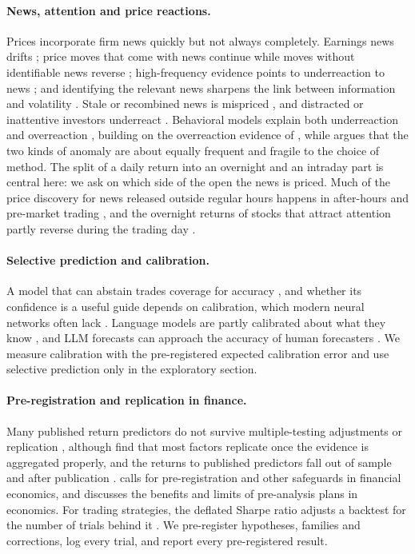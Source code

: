 \paragraph{News, attention and price reactions.} Prices incorporate firm news quickly
\citep{patell1984,busse2002} but not always completely. Earnings news drifts \citep{bernard1989}; price moves
that come with news continue while moves without identifiable news reverse \citep{chan2003,savor2012};
high-frequency evidence points to underreaction to news \citep{jiang2021}; and identifying the relevant news
sharpens the link between information and volatility \citep{boudoukh2019}. Stale or recombined news is
mispriced \citep{tetlock2011,fedyk2023}, and distracted or inattentive investors underreact
\citep{hirshleifer2009,dellavigna2009}. Behavioral models explain both underreaction and overreaction
\citep{barberis1998,daniel1998}, building on the overreaction evidence of \citet{debondt1985}, while
\citet{fama1998} argues that the two kinds of anomaly are about equally frequent and fragile to the choice of
method. The split of a daily return into an overnight and an intraday part \citep{lou2019} is central here: we
ask on which side of the open the news is priced. Much of the price discovery for news released outside regular
hours happens in after-hours and pre-market trading \citep{barclay2003}, and the overnight returns of stocks that
attract attention partly reverse during the trading day \citep{berkman2012}.

\paragraph{Selective prediction and calibration.} A model that can abstain trades coverage for accuracy
\citep{geifman2017}, and whether its confidence is a useful guide depends on calibration, which modern neural
networks often lack \citep{pakdamannaeini2015,guo2017}. Language models are partly calibrated about what they know
\citep{kadavath2022}, and LLM forecasts can approach the accuracy of human forecasters
\citep{halawi2024,schoenegger2024}. We measure calibration with the pre-registered expected calibration error
and use selective prediction only in the exploratory section.

\paragraph{Pre-registration and replication in finance.} Many published return predictors do not survive
multiple-testing adjustments or replication \citep{harvey2016,hou2020}, although \citet{jensen2023} find that
most factors replicate once the evidence is aggregated properly, and the returns to published predictors fall
out of sample and after publication \citep{mclean2016}. \citet{harvey2017} calls for pre-registration
and other safeguards in financial economics, and \citet{olken2015} discusses the benefits and limits of
pre-analysis plans in economics. For trading strategies, the deflated Sharpe ratio adjusts a backtest for the
number of trials behind it \citep{bailey2014}. We pre-register hypotheses, families and corrections, log every
trial, and report every pre-registered result.

